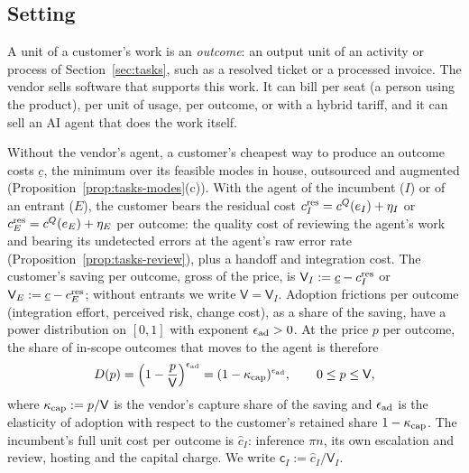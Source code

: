 \subsection{Setting}\label{sec:product-setup}

A unit of a customer's work is an \emph{outcome}: an output unit of an activity or process of Section~\ref{sec:tasks}, such as a resolved ticket or a processed invoice. The vendor sells software that supports this work. It can bill per seat (a person using the product), per unit of usage, per outcome, or with a hybrid tariff, and it can sell an AI agent that does the work itself.

\begin{assumption}\label{ass:prod-value}
Without the vendor's agent, a customer's cheapest way to produce an outcome costs $\underline c$, the minimum over its feasible modes in house, outsourced and augmented (Proposition~\ref{prop:tasks-modes}(c)). With the agent of the incumbent ($I$) or of an entrant ($E$), the customer bears the residual cost $c^{\rm res}_I=c^Q(e_I)+\eta_I$ or $c^{\rm res}_E=c^Q(e_E)+\eta_E$ per outcome: the quality cost of reviewing the agent's work and bearing its undetected errors at the agent's raw error rate (Proposition~\ref{prop:tasks-review}), plus a handoff and integration cost. The customer's saving per outcome, gross of the price, is $\mathsf V_I:=\underline c-c^{\rm res}_I$ or $\mathsf V_E:=\underline c-c^{\rm res}_E$; without entrants we write $\mathsf V=\mathsf V_I$. Adoption frictions per outcome (integration effort, perceived risk, change cost), as a share of the saving, have a power distribution on $[0,1]$ with exponent $\epsilon_{\rm ad}>0$. At the price $p$ per outcome, the share of in-scope outcomes that moves to the agent is therefore
\begin{equation}\label{eq:prod-D}
D(p)=\Bigl(1-\frac{p}{\mathsf V}\Bigr)^{\epsilon_{\rm ad}}=(1-\kappa_{\rm cap})^{\epsilon_{\rm ad}},\qquad 0\le p\le\mathsf V,
\end{equation}
where $\kappa_{\rm cap}:=p/\mathsf V$ is the vendor's capture share of the saving and $\epsilon_{\rm ad}$ is the elasticity of adoption with respect to the customer's retained share $1-\kappa_{\rm cap}$. The incumbent's full unit cost per outcome is $\hat c_I$: inference $\pi n$, its own escalation and review, hosting and the capital charge. We write $\mathsf c_I:=\hat c_I/\mathsf V_I$.
\end{assumption}

